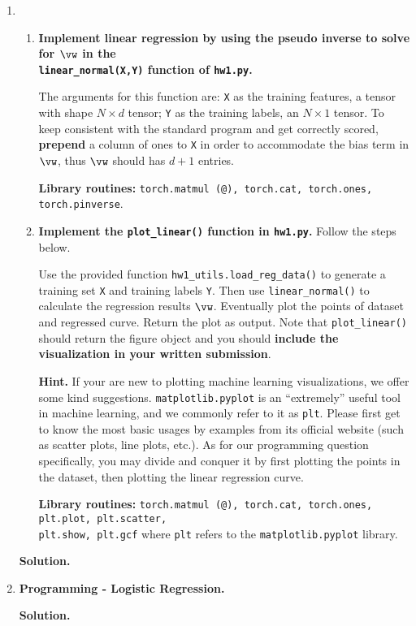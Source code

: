 \documentclass{article}
\theoremstyle{definition}
\theoremstyle{remark}
\newenvironment{Q}
        {%
          \clearpage
          \item
        }
        {%
          \phantom{s} %
          \bigskip
          \textbf{Solution.}
        }
\begin{document}
\begin{enumerate}[font={\Large\bfseries},left=0pt]
\begin{Q}
\begin{enumerate}
\item \textbf{Implement linear regression by using the pseudo inverse to solve for $\vw$ in the \\ \texttt{linear\_normal(X,Y)} function of \texttt{hw1.py}.}

The arguments for this function are: \texttt{X} as the training features, a tensor with shape $N \times d$ tensor; \texttt{Y} as the training labels, an $N \times 1$ tensor. To keep consistent with the standard program and get correctly scored, \textbf{prepend} a column of ones to \texttt{X} in order to accommodate the bias term in $\vw$, thus $\vw$ should has $d+1$ entries.
            
\textbf{Library routines:} \texttt{torch.matmul (@), torch.cat, torch.ones, torch.pinverse}.
            
\item \textbf{Implement the \texttt{plot\_linear()} function in \texttt{hw1.py}.} Follow the steps below.

Use the provided function \texttt{hw1\_utils.load\_reg\_data()} to generate a training set \texttt{X} and training labels \texttt{Y}. Then use \texttt{linear\_normal()} to calculate the regression results $\vw$. Eventually  plot the points of dataset and regressed curve.   Return the plot as output. Note that \texttt{plot\_linear()} should return the figure object and you should \textbf{include the visualization in your written submission}.

\textbf{Hint.} If your are new to plotting machine learning visualizations, we offer some kind suggestions. \texttt{matplotlib.pyplot} is an ``extremely'' useful tool in machine learning, and we commonly refer to it as \texttt{plt}. Please first get to know the most basic usages by examples from its official website (such as scatter plots, line plots, etc.). As for our programming question specifically, you may divide and conquer it by first plotting the points in the dataset, then plotting the linear regression curve.

\textbf{Library routines:} \texttt{torch.matmul (@), torch.cat, torch.ones, plt.plot, plt.scatter,} \\ \texttt{plt.show, plt.gcf} where \texttt{plt} refers to the \texttt{matplotlib.pyplot} library.
\end{enumerate}
\end{Q}

\begin{Q}
\textbf{\Large Programming - Logistic Regression.}


\end{Q}
\end{enumerate}
\end{document}
